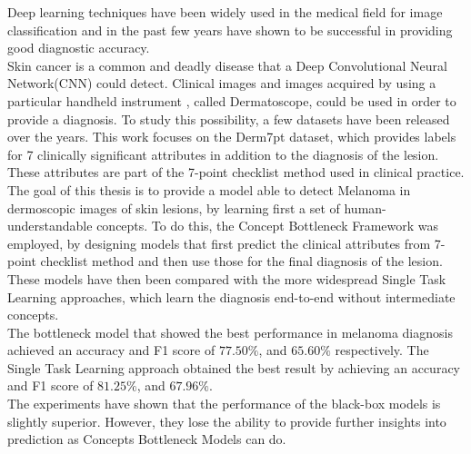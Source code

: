 \documentclass[a4print,english,lof,lot,twoside]{univpmthesis}
\begin{document}
\begin{thesisabstract}[english]
Deep learning techniques have been widely used in the medical field for image classification and in the past few years have shown to be successful in providing good diagnostic accuracy.\\
Skin cancer is a common and deadly disease that a Deep Convolutional Neural Network(CNN) could detect. Clinical images and images acquired by using a particular handheld instrument , called Dermatoscope, could be used in order to provide a diagnosis. 
To study this possibility, a few datasets have been released over the years. This work focuses on the Derm7pt dataset, which provides labels for 7 clinically significant attributes in addition to the diagnosis of the lesion. These attributes are part of the 7-point checklist method used in clinical practice.
The goal of this thesis is to provide a model able to detect Melanoma in dermoscopic images of skin lesions, by learning first a set of human-understandable concepts.
To do this, the Concept Bottleneck Framework was employed, by designing models that first predict the clinical attributes from 7-point checklist method and then use those for the final diagnosis of the lesion.
These models have then been compared with the more widespread Single Task Learning approaches, which learn the diagnosis end-to-end without intermediate concepts.\\
The bottleneck model that showed the best performance in melanoma diagnosis achieved an accuracy and F1 score of $77.50\%$, and $65.60\%$ respectively.
The Single Task Learning approach obtained the best result by achieving an accuracy and F1 score of $81.25\%$, and $67.96\%$. \\
The experiments have shown that the performance of the black-box models is slightly superior. However, they lose the ability to provide further insights into prediction as Concepts Bottleneck Models can do. \\


\end{thesisabstract}
\end{document}
